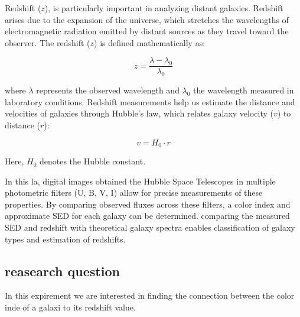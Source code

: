 \documentclass[11pt,a4paper]{article}
\begin{document}
Redshift ($z$), is particularly important in analyzing distant galaxies. Redshift arises due to the expansion of the universe, which stretches the wavelengths of electromagnetic radiation emitted by distant sources as they travel toward the observer. The redshift ($z$) is defined mathematically as:

\begin{equation}
 z =  \frac{\lambda - \lambda_0}{\lambda_0}
\end{equation}



where $\lambda$ represents the observed wavelength and $\lambda_0$ the  wavelength measured in laboratory conditions. Redshift measurements help us estimate the distance and velocities of galaxies through Hubble's law, which relates galaxy velocity ($v$) to distance ($r$):

\begin{equation}
  v = H_0 \cdot r
\end{equation}


Here, $H_0$ denotes the Hubble constant.

In this la, digital images obtained the Hubble Space Telescopes in multiple photometric filters (U, B, V, I) allow for precise measurements of these properties. By comparing observed fluxes across these filters, a color index and approximate SED for each galaxy can be determined. comparing the measured SED and redshift with theoretical galaxy spectra enables classification of galaxy types and estimation of redshifts.


\subsection{reasearch question}
In this expirement we are interested in finding the connection between the color inde of a galaxi to its redshift value.
\end{document}
